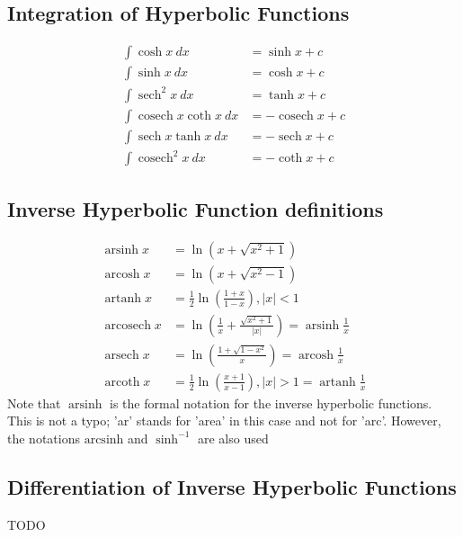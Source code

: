 \documentclass[12pt]{article}
\DeclareMathOperator{\cosech}{cosech}
\DeclareMathOperator{\sech}{sech}
\DeclareMathOperator{\arsinh}{arsinh}
\DeclareMathOperator{\arcosh}{arcosh}
\DeclareMathOperator{\artanh}{artanh}
\DeclareMathOperator{\arcosech}{arcosech}
\DeclareMathOperator{\arsech}{arsech}
\DeclareMathOperator{\arcoth}{arcoth}
\newcommand{\pwidth}{0.46\linewidth}
\begin{document}
	\hfill
	\begin{minipage}[t]{\pwidth}

		\subsection{Integration of Hyperbolic Functions}
		\begin{align}
			 \int \cosh x \ dx &= \sinh x + c \\
			 \int \sinh x \ dx &= \cosh x + c \\
			 \int \sech^2x \ dx &= \tanh x + c \\
			 \int \cosech x \coth x \ dx &= -\cosech x + c \\
			 \int \sech x \tanh x \ dx &= -\sech x + c \\
			 \int \cosech^2x \ dx &= -\coth x + c
		\end{align}

		\subsection{Inverse Hyperbolic Function definitions}
		\begin{align}
			\arsinh x &= \ln(x + \sqrt{x^2 + 1}) \\
			\arcosh x &= \ln(x + \sqrt{x^2 - 1}) \\
			\artanh x &= \frac{1}{2} \ln\left(\frac{1+x}{1-x}\right), |x|<1 \\
			\arcosech x &= \ln\left(\frac 1x + \frac{\sqrt{x^2 + 1}}{|x|}\right) = \arsinh \frac 1x \\
			\arsech x &= \ln\left(\frac{1 + \sqrt{1-x^2}}{x}\right) = \arcosh \frac 1x \\
			\arcoth x &= \frac{1}{2} \ln\left(\frac{x+1}{x-1}\right), |x|>1 = \artanh \frac 1x
		\end{align}
		{ \small * Note that $\arsinh$ is the formal notation for the inverse 
		hyperbolic functions. This is not a typo; 'ar' stands for 'area' in this
		case and not for 'arc'. However, the notations $\mathrm{arcsinh}$ and 
		$\sinh^{-1}$ are also used}

		\subsection{Differentiation of Inverse Hyperbolic Functions}
		TODO
	\end{minipage}
\end{document}
